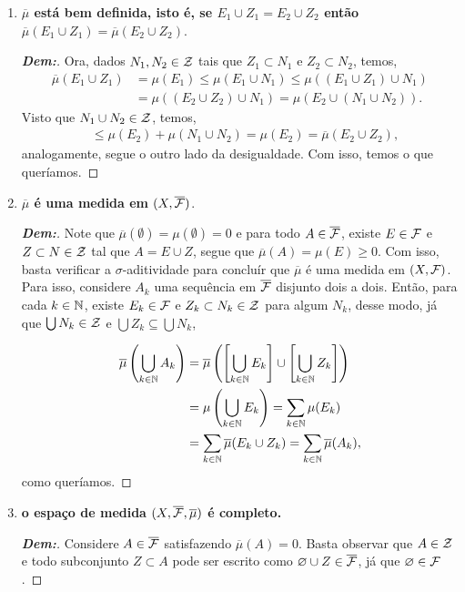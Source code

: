\begin{enumerate}[label=(\alph*), wide, labelindent=0pt]
  \item \textbf{$\overline \mu$ está bem definida, isto é, 
    se $E_1 \cup Z_1 = E_2 \cup Z_2$ então $\overline \mu (E_1 \cup Z_1) = 
    \overline \mu (E_2 \cup Z_2)$}.
    \begin{proof}[\textbf{Dem:}]Ora, dados $N_1, N_2 \in \mathcal Z$ tais que $Z_1 \subset N_1$ 
      e $Z_2 \subset N_2$, temos,
      \begin{align*}
        \overline{\mu}(E_1\cup Z_1) &= \mu(E_1) \le \mu(E_1 \cup N_1)
        \le \mu((E_1 \cup Z_1) \cup N_1)\\
        &=\mu((E_2 \cup Z_2) \cup N_1) = \mu(E_2 \cup (N_1 \cup N_2)).
      \end{align*}
      Visto que $N_1 \cup N_2 \in \mathcal Z$, temos,
      \begin{align*}
        &\le\mu(E_2) + \mu(N_1 \cup N_2) = \mu(E_2) = \overline{\mu}(E_2 \cup Z_2), 
      \end{align*}
      analogamente, segue o outro lado da desigualdade. Com isso, temos o que queríamos.
    \end{proof}
  \item \textbf{$\overline \mu$ é uma medida em $(X, \overline{\mathcal F})$}. 
    \begin{proof}[\textbf{Dem:}]
      Note que $\overline\mu(\emptyset) = \mu(\emptyset) = 0$ e para todo $A \in 
      \overline{\mathcal F}$, existe $E \in \mathcal F$ e $Z \subset N \in \mathcal Z$ tal que 
      $A = E \cup Z$, 
      segue que $\overline \mu(A) = \mu(E) \ge 0$. Com isso, basta verificar a 
      $\sigma$-aditividade para concluír que $\overline \mu$ é uma medida em $(X, \mathcal F)$.
      Para isso, considere ${A_k}$ uma sequência em $\overline{\mathcal F}$ 
      disjunto dois a dois. Então, para 
      cada $k \in \mathbb N$, existe $E_k \in \mathcal F$ e $Z_k \subset N_k \in \mathcal Z$ 
      para algum $N_k$, desse modo, já que $\bigcup N_k \in \mathcal Z$ e 
      $\bigcup Z_k \subseteq \bigcup N_k$, 

      \begin{align*}
        \overline \mu\left(\bigcup_{k \in \mathbb N} A_k \right) &=
        \overline\mu\left(\left[\bigcup_{k \in \mathbb N} E_k \right] \cup 
        \left[\bigcup_{k \in \mathbb N} Z_k \right]\right)\\ 
        &= \mu\left(\bigcup_{k \in \mathbb N} E_k\right) = 
        \sum_{k \in \mathbb N} \mu(E_k)\\
        &= \sum_{k \in \mathbb N} \overline \mu(E_k \cup Z_k)
        =\sum_{k \in \mathbb N} \overline \mu(A_k),
      \end{align*}
      como queríamos.
    \end{proof}
  \item \textbf{o espaço de medida $(X, \overline{\mathcal F}, \overline \mu)$ é completo.}
    \begin{proof}[\textbf{Dem:}] Considere $A \in \overline{\mathcal F}$ satisfazendo 
      $\overline{\mu}(A) = 0$. Basta observar que $A \in \mathcal Z$ e 
      todo subconjunto $Z \subset A$
      pode ser escrito como $\varnothing \cup Z \in \overline{\mathcal F}$, já que 
      $\varnothing \in \mathcal F$. 
            

\end{proof}
\end{enumerate}
